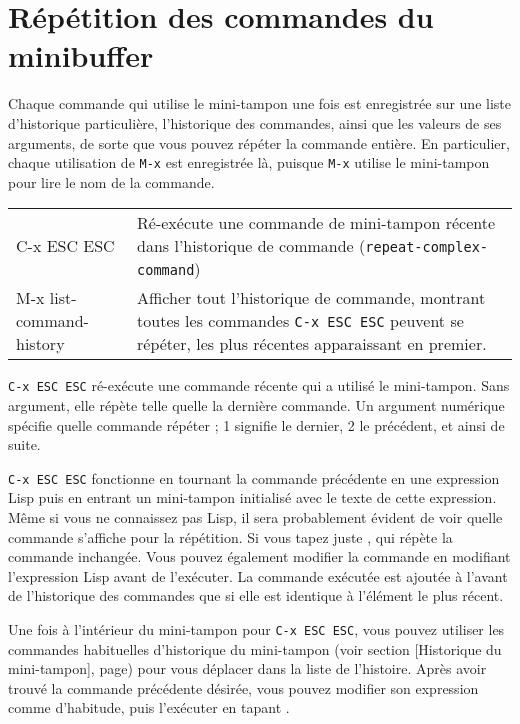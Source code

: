 \section{Répétition des commandes du minibuffer}

Chaque commande qui utilise le mini-tampon une fois est enregistrée
sur une liste d'historique particulière, l'historique des commandes,
ainsi que les valeurs de ses arguments, de sorte que vous pouvez
répéter la commande entière. En particulier, chaque utilisation de
\texttt{M-x} est enregistrée là, puisque \texttt{M-x} utilise le
mini-tampon pour lire le nom de la commande.

\begin{center}
  \begin{tabular}[m]{>{\ttfamily}lp{.85\linewidth}}
    C-x ESC ESC & Ré-exécute une commande de mini-tampon récente dans
    l'historique de commande (\texttt{repeat-complex-command}) \\
    M-x list-command-history & Afficher tout l'historique de commande,
    montrant toutes les commandes \texttt{C-x ESC ESC} peuvent
    se répéter, les plus récentes apparaissant en premier. 
  \end{tabular}
\end{center}

\texttt{C-x ESC ESC} ré-exécute une commande récente qui a utilisé le
    mini-tampon. Sans argument, elle répète telle quelle la dernière
    commande. Un argument numérique spécifie quelle commande répéter ;
    1 signifie le dernier, 2 le précédent, et ainsi de suite.

\texttt{C-x ESC ESC} fonctionne en tournant la commande précédente en
une expression Lisp puis en entrant un mini-tampon initialisé avec le
texte de cette expression. Même si vous ne connaissez pas Lisp, il
sera probablement évident de voir quelle commande s'affiche pour la
répétition. Si vous tapez juste \RET, qui répète la commande
inchangée. Vous pouvez également modifier la commande en modifiant
l'expression Lisp avant de l'exécuter. La commande exécutée est
ajoutée à l'avant de l'historique des commandes que si elle est
identique à l'élément le plus récent.

Une fois à l'intérieur du mini-tampon pour \texttt{C-x ESC ESC}, vous
pouvez utiliser les commandes habituelles d'historique du mini-tampon (voir
section [Historique du mini-tampon], page)
pour vous déplacer dans la liste de l'histoire. Après avoir trouvé la
commande précédente désirée, vous pouvez modifier son expression comme
d'habitude, puis l'exécuter en tapant \RET .

